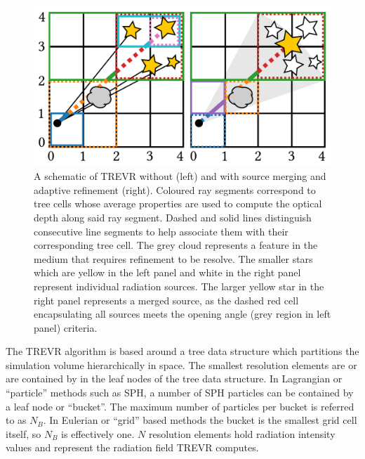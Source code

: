\documentclass[fleq,usenatbib]{mnras}
\newcommand{\acro}{TREVR}
\begin{document}
\begin{figure}
\includegraphics[width=1\linewidth]{Figures/algorithm.pdf}
\caption{A schematic of \acro{} without (left) and with source merging and 
adaptive refinement (right). Coloured ray segments correspond to tree cells 
whose average properties are used to compute the optical depth along said ray 
segment. Dashed and solid lines distinguish consecutive line segments to 
help associate them with their corresponding tree cell. The grey cloud 
represents a feature in the medium that requires refinement to be resolve. 
The smaller stars which are yellow in the left panel and white in the right 
panel represent individual radiation sources. The larger yellow star in the 
right panel represents a merged source, as the dashed red cell encapsulating 
all sources meets the opening angle (grey region in left panel) criteria.} 

\label{fig:algorithm}
\end{figure}
The \acro{} algorithm is based around a tree data structure which partitions 
the simulation volume hierarchically in space. The smallest resolution 
elements are or are contained by in the leaf nodes of the tree data structure. 
In Lagrangian or ``particle'' methods such as SPH, a number of SPH particles 
can be contained by a leaf node or ``bucket''. The maximum number of particles 
per bucket is referred to as $N_B$. In Eulerian or ``grid'' based methods the 
bucket is the smallest grid cell itself, so $N_B$ is effectively one. $N$ 
resolution elements hold radiation intensity values and represent the 
radiation field \acro{} computes. 
\end{document}
